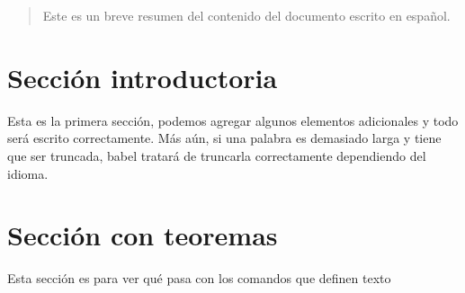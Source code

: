 \documentclass{article}
\begin{document}
\tableofcontents

\vspace{2cm} %

\begin{abstract}
Este es un breve resumen del contenido del 
documento escrito en español.
\end{abstract}

\section{Sección introductoria}
Esta es la primera sección, podemos agregar 
algunos elementos adicionales y todo será 
escrito correctamente. Más aún, si una palabra 
es demasiado larga y tiene que ser truncada, 
babel tratará de truncarla correctamente 
dependiendo del idioma.

\section{Sección con teoremas}
Esta sección es para ver qué pasa con los comandos 
que definen texto
\end{document}
